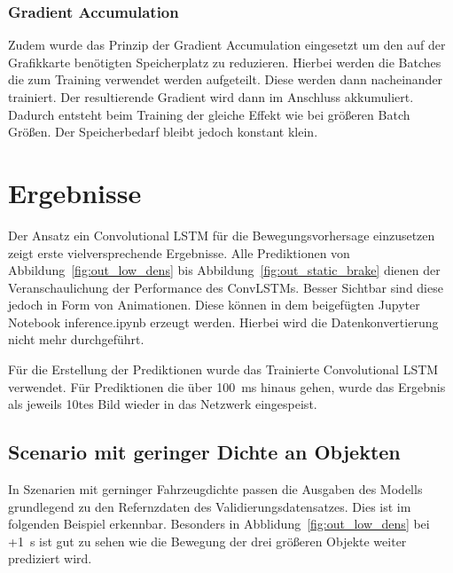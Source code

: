 \documentclass[12pt]{article}
\begin{document}
        \subsubsection{Gradient Accumulation}
            Zudem wurde das Prinzip der Gradient Accumulation eingesetzt um den auf der Grafikkarte benötigten Speicherplatz zu reduzieren. 
            Hierbei werden die Batches die zum Training verwendet werden aufgeteilt. Diese werden dann nacheinander trainiert. Der resultierende Gradient wird dann im Anschluss akkumuliert.
            Dadurch entsteht beim Training der gleiche Effekt wie bei größeren Batch Größen. Der Speicherbedarf bleibt jedoch konstant klein.~\cite{Ttowardsdatascience2021}

\section{Ergebnisse}
    Der Ansatz ein Convolutional LSTM für die Bewegungsvorhersage einzusetzen zeigt erste vielversprechende Ergebnisse.
    Alle Prediktionen von Abbildung~\ref{fig:out_low_dens} bis Abbildung~\ref{fig:out_static_brake} dienen der Veranschaulichung der Performance des ConvLSTMs. 
    Besser Sichtbar sind diese jedoch in Form von Animationen. Diese können in dem beigefügten Jupyter Notebook inference.ipynb erzeugt werden. 
    Hierbei wird die Datenkonvertierung nicht mehr durchgeführt. 

    Für die Erstellung der Prediktionen wurde das Trainierte Convolutional LSTM verwendet. Für Prediktionen die über 100~ms hinaus gehen, wurde das Ergebnis als jeweils 10tes Bild wieder in das Netzwerk eingespeist.
    
    
    \pagebreak
    \subsection{Scenario mit geringer Dichte an Objekten}
        In Szenarien mit gerninger Fahrzeugdichte passen die Ausgaben des Modells grundlegend zu den Refernzdaten des Validierungsdatensatzes.
        Dies ist im folgenden Beispiel erkennbar. Besonders in Abblidung~\ref{fig:out_low_dens} bei +1~s ist gut zu sehen wie die Bewegung der drei größeren Objekte weiter prediziert wird. 
\end{document}
